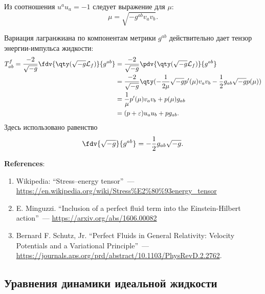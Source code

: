\documentclass[\docroot/reports/draft/report.tex]{subfiles}
\begin{document}
    Из соотношения $u^a u_a = -1$ следует выражение для $\mu$:
    \begin{equation*}
        \mu = \sqrt{-g^{ab} v_a v_b} .
    \end{equation*}

    Вариация лагранжиана по компонентам метрики $g^{ab}$ действительно дает тензор энергии-импульса жидкости:
    \begin{equation}\begin{aligned}
        T^f_{ab} = \frac{-2}{\sqrt{-g}} \fdv{\qty(\sqrt{-g} \mathcal{L}_f)}{g^{ab}} &=
            \frac{-2}{\sqrt{-g}} \pdv{\qty(\sqrt{-g} \mathcal{L}_f)}{g^{ab}} \\ &=
            \frac{-2}{\sqrt{-g}} \qty(
                - \frac{1}{2 \mu} \sqrt{-g} p'(\mu) v_a v_b - \frac{1}{2} g_{ab} \sqrt{-g} p(\mu)
            ) \\ &=
            \frac{1}{\mu} p'(\mu) v_a v_b + p(\mu) g_{ab} \\ &=
            (p + \varepsilon) u_a u_b + p g_{ab} .
    \end{aligned}\end{equation}
    Здесь использовано равенство
    \begin{equation*}
        \fdv{\sqrt{-g}}{g^{ab}} = - \frac{1}{2} g_{ab} \sqrt{-g} .
    \end{equation*}

    \vspace{1cm}

    \textbf{\Large{References}}:
    \begin{enumerate}
        \item Wikipedia: \enquote{Stress–energy tensor}~--- \url{https://en.wikipedia.org/wiki/Stress%E2%80%93energy_tensor}
        \item E. Minguzzi. \enquote{Inclusion of a perfect fluid term into the Einstein-Hilbert action}~--- \url{https://arxiv.org/abs/1606.00082}
        \item \label{bib:schutz-velocity} Bernard F. Schutz, Jr. \enquote{Perfect Fluids in General Relativity: Velocity Potentials and a Variational Principle}~--- \url{https://journals.aps.org/prd/abstract/10.1103/PhysRevD.2.2762}.
    \end{enumerate}

\subsection{Уравнения динамики идеальной жидкости}
\end{document}
